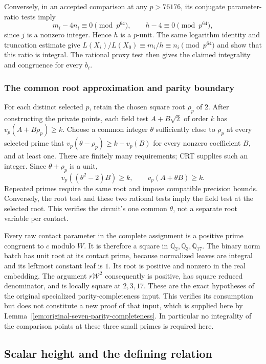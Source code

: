 Conversely, in an accepted comparison at any $p>76176$, its conjugate
parameter-ratio tests imply
\[
 m_i-4n_i\equiv0\pmod{p^{64}},\qquad h-4\equiv0\pmod{p^{64}},
\]
since $j$ is a nonzero integer. Hence $h$ is a $p$-unit. The same
logarithm identity and truncation estimate give
$L(X_i)/L(X_0)\equiv m_i/h\equiv n_i\pmod{p^{64}}$ and show
that this ratio is integral. The rational proxy test then gives the
claimed integrality and congruence for every $b_i$.

\subsubsection{The common root approximation and parity boundary}\label{subsec:o8-root-proof}
For each distinct selected $p$, retain the chosen square root
$\rho_p$ of $2$. After constructing the private points, each field
test $A+B\sqrt2$ of order $k$ has $v_p(A+B\rho_p)\ge k$.
Choose a common integer $\theta$ sufficiently close to $\rho_p$ at
every selected prime that
$v_p(\theta-\rho_p)\ge k-v_p(B)$ for every nonzero coefficient $B$,
and at least one. There are finitely many requirements; CRT supplies
such an integer. Since $\theta+\rho_p$ is a unit,
\[
 v_p((\theta^2-2)B)\ge k,\qquad v_p(A+\theta B)\ge k.
\]
Repeated primes require the same root and impose compatible precision
bounds. Conversely, the root test and these two rational tests imply
the field test at the selected root. This verifies the circuit's one
common $\theta$, not a separate root variable per contact.

Every raw contact parameter in the complete assignment is a positive
prime congruent to $c$ modulo $W$. It is therefore a square in
$\mathbb Q_2,\mathbb Q_3,\mathbb Q_{17}$. The binary norm batch has
unit root at its contact prime, because normalized leaves are integral
and its leftmost constant leaf is $1$. Its root is positive and nonzero
in the real embedding. The argument $r\mathcal W^2$ consequently is
positive, has square reduced denominator, and is locally square at
$2,3,17$. These are the exact hypotheses of the original specialized
parity-completeness input. This verifies its consumption but does not
constitute a new proof of that input, which is supplied here by
Lemma~\ref{lem:original-seven-parity-completeness}. In particular no integrality of
the comparison points at these three small primes is required here.

\subsection{Scalar height and the defining relation}

